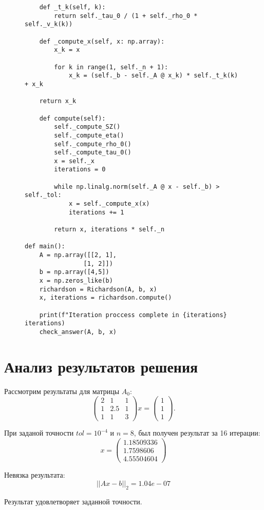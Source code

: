 \documentclass[a4paper,12pt]{article}
\begin{document}
		\begin{figure}[h]
		\begin{verbatim}
	def _t_k(self, k):
		return self._tau_0 / (1 + self._rho_0 * self._v_k(k))

	def _compute_x(self, x: np.array):
		x_k = x
		
		for k in range(1, self._n + 1):
			x_k = (self._b - self._A @ x_k) * self._t_k(k) + x_k
	
	return x_k
	
	def compute(self):
		self._compute_SZ()
		self._compute_eta()
		self._compute_rho_0()
		self._compute_tau_0()
		x = self._x
		iterations = 0
		
		while np.linalg.norm(self._A @ x - self._b) > self._tol:
			x = self._compute_x(x)
			iterations += 1
			
		return x, iterations * self._n

def main():
	A = np.array([[2, 1],
				[1, 2]])
	b = np.array([4,5])
	x = np.zeros_like(b)
	richardson = Richardson(A, b, x)
	x, iterations = richardson.compute()
	
	print(f"Iteration proccess complete in {iterations} iterations)
	check_answer(A, b, x)
		\end{verbatim}
	\end{figure}
	\newpage
	\section{Анализ результатов решения}
	Рассмотрим результаты для матрицы $A_0$:
		\[
	\begin{pmatrix}
		2 & 1 & 1 \\
		1 & 2.5 & 1 \\
		1 & 1 & 3
	\end{pmatrix} x = 
	\begin{pmatrix}
		1\\
		1\\
		1
	\end{pmatrix}.
	\]
	
	При заданой точности $tol=10^{-4}$ и $n=8$, был получен результат за 16 итерации:
	\[
		x = 
		\begin{pmatrix}
			1.18509336\\ 1.7598606  \\4.55504604
		\end{pmatrix}
	\]
	
		Невязка результата:
		\[
			||Ax - b||_2 = 1.04e-07
		\]
		
		Результат удовлетворяет заданной точности.
		
\end{document}
